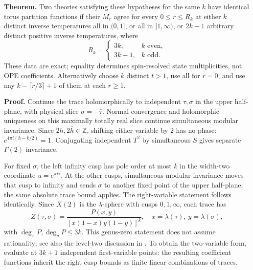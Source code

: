 \documentclass[aps,prl,reprint,10pt,longbibliography]{revtex4-2}
\newcommand{\Z}{\mathbb Z}
\begin{document}
\noindent\textbf{Theorem.}
Two theories satisfying these hypotheses for the same $k$ have identical
torus partition functions if their $M_r$ agree for every $0\le r\le R_k$
at either $k$ distinct inverse temperatures all in $(0,1]$, or all in
$[1,\infty)$, or $2k-1$ arbitrary distinct positive inverse temperatures, where
\begin{equation}
 R_k=\begin{cases}3k,&k\text{ even},\\3k-1,&k\text{ odd}.\end{cases}
 \label{eq:R}
\end{equation}
These data are exact; equality determines spin-resolved state
multiplicities, not OPE coefficients.
Alternatively choose $k$ distinct $t>1$, use all for $r=0$, and use
any $k-\lceil r/3\rceil+1$ of them at each $r\ge1$.

\noindent\textbf{Proof.}
Continue the trace holomorphically to independent $\tau,\sigma$ in the
upper half-plane, with physical slice $\sigma=-\bar\tau$. Normal
convergence and holomorphic uniqueness on this maximally totally real
slice continue simultaneous modular invariance. Since $2h,2\bar h\in\Z$, shifting either variable by $2$
has no phase: $e^{4\pi i(h-k/2)}=1$. Conjugating independent $T^2$
by simultaneous $S$ gives separate $\Gamma(2)$ invariance.

For fixed $\sigma$, the left infinity cusp has pole order at most $k$
in the width-two coordinate $u=e^{\pi i\tau}$. At the other cusps,
simultaneous modular invariance moves that cusp to infinity and
sends $\sigma$ to another fixed point of the upper half-plane; the
same absolute trace bound applies. The right-variable statement follows
identically. Since $X(2)$ is the $\lambda$-sphere with cusps
$0,1,\infty$, each trace has
\begin{equation}
 Z(\tau,\sigma)=\frac{P(x,y)}{[x(1-x)y(1-y)]^k},
 \quad x=\lambda(\tau),\ y=\lambda(\sigma),
 \label{eq:form}
\end{equation}
with $\deg_xP,\deg_yP\le3k$. This genus-zero statement does not assume
rationality; see also the level-two discussion in \cite{bae}. To obtain
the two-variable form, evaluate at $3k+1$ independent first-variable
points: the resulting coefficient functions inherit the right cusp
bounds as finite linear combinations of traces.
\end{document}
